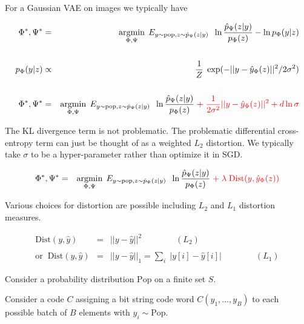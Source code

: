 {

For a Gaussian VAE on images we typically have

{\huge
\begin{eqnarray*}
\Phi^*, \Psi^* & = & \operatorname*{argmin}_{\Phi,\Psi}\; E_{y\sim\mathrm{pop},z \sim \hat{p}_\Psi(z|y)}\;\; \ln \frac{ \hat{p}_\Psi(z|y)}{p_\Phi(z)}  - \ln p_\Phi(y|z)\\
\\
p_\Phi(y|z) & \propto & \frac{1}{Z}\;\exp(-||y-\hat{y}_\Phi(z)||^2/2\sigma^2) \\
\\
\Phi^*, \Psi^* & = & \operatorname*{argmin}_{\Phi,\Psi}\; E_{y\sim\mathrm{pop},z \sim \hat{p}_\Psi(z|y)}\;\; \ln \frac{ \hat{p}_\Psi(z|y)}{p_\Phi(z)}  \;{\color{red} +\; \frac{1}{2\sigma^2}||y-\hat{y}_\Phi(z)||^2 + d\ln \sigma}
\end{eqnarray*}
}

The KL divergence term is not problematic. The problematic differential cross-entropy term can just be thought of as a weighted $L_2$ distortion.  We typically take $\sigma$ to be a hyper-parameter rather than optimize it in SGD.



{\huge
\begin{eqnarray*}
\Phi^*, \Psi^* & = & \operatorname*{argmin}_{\Phi,\Psi}\; E_{y\sim\mathrm{pop},z \sim \hat{p}_\Psi(z|y)}\;\; \ln \frac{ \hat{p}_\Psi(z|y)}{p_\Phi(z)}  \;{\color{red} +\; \lambda\;\mathrm{Dist}(y,\hat{y}_\Phi(z))}
\end{eqnarray*}
}

\vfill
Various choices for distortion are possible including $L_2$ and $L_1$ distortion measures.

\begin{eqnarray*}
\mathrm{Dist}(y,\hat{y}) & = & ||y-\hat{y}||^2 \hspace{4em}(L_2) \\
\\
\mathrm{or}\;\;\mathrm{Dist}(y,\hat{y}) & = & ||y-\hat{y}||_1 = \sum_i \;|y[i] - \hat{y}[i]| \hspace{4em}(L_1)
\end{eqnarray*}



}



Consider a probability distribution $\mathrm{Pop}$ on a finite set $S$.

\vfill
Consider a code $C$ assigning a bit string code word $C(y_1,\ldots,y_B)$ to each possible batch of $B$ elements with $y_i \sim \mathrm{Pop}$.

